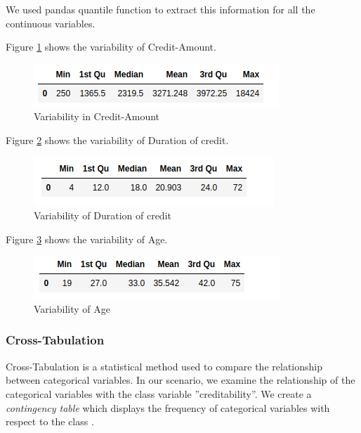\documentclass[sigconf]{acmart}
\begin{document}
We used pandas quantile function to extract this information for all the continuous variables.

Figure \ref{fig:Figure17} shows the variability of Credit-Amount.

\begin{figure}[htb]
  \centering
  \includegraphics[width=1.0\columnwidth]{images/Figure17.png}
  \caption{Variability in Credit-Amount}
  \label{fig:Figure17} 
\end{figure}

Figure \ref{fig:Figure18} shows the variability of Duration of credit.

\begin{figure}[htb]
  \centering
  \includegraphics[width=1.0\columnwidth]{images/Figure18.png}
  \caption{Variability of Duration of credit}
  \label{fig:Figure18} 
\end{figure}

Figure \ref{fig:Figure19} shows the variability of Age.

\begin{figure}[htb]
  \centering
  \includegraphics[width=1.0\columnwidth]{images/Figure19.png}
  \caption{Variability of Age}
  \label{fig:Figure19} 
\end{figure}

\subsubsection{Cross-Tabulation}

Cross-Tabulation is a statistical method used to compare the relationship between categorical variables. In our scenario, we examine the relationship of the categorical variables with the class variable ''creditability''. We create a \emph{contingency table} which displays the frequency of categorical variables with respect to the class \cite{cross-tabulation}. 
\end{document}
